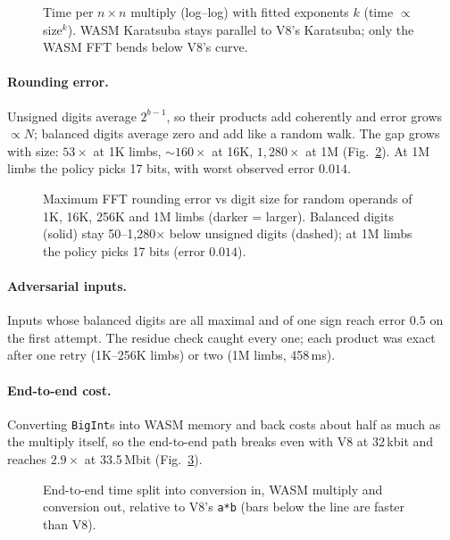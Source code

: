 \documentclass[10pt,twocolumn]{article}
\begin{document}
\begin{figure}[t]
\centering

\caption{Time per $n\times n$ multiply (log--log) with fitted exponents
$k$ (time $\propto$ size$^k$). WASM Karatsuba stays parallel to V8's Karatsuba; only the
WASM FFT bends below V8's curve.}
\label{fig:scaling}
\end{figure}

\paragraph{Rounding error.} Unsigned digits average $2^{b-1}$, so their products add
coherently and error grows $\propto N$; balanced digits average zero and add like a
random walk. The gap grows with size: $53\times$ at 1K limbs, $\sim160\times$ at 16K,
$1{,}280\times$ at 1M (Fig.~\ref{tab:err}). At 1M limbs the policy picks 17 bits, with
worst observed error $0.014$.

\begin{figure}[t]
\centering

\caption{Maximum FFT rounding error vs digit size for random operands of 1K, 16K, 256K
and 1M limbs (darker = larger). Balanced digits (solid) stay 50--1{,}280$\times$ below
unsigned digits (dashed); at 1M limbs the policy picks 17 bits (error $0.014$).}
\label{tab:err}
\end{figure}

\paragraph{Adversarial inputs.} Inputs whose balanced digits are all maximal and of one
sign reach error $0.5$ on the first attempt. The residue check caught every one; each
product was exact after one retry (1K--256K limbs) or two (1M limbs, 458\,ms).

\paragraph{End-to-end cost.} Converting \texttt{BigInt}s into WASM memory and back costs
about half as much as the multiply itself, so the end-to-end path breaks even with V8 at
32\,kbit and reaches $2.9\times$ at 33.5\,Mbit (Fig.~\ref{fig:e2e}).

\begin{figure}[t]
\centering

\caption{End-to-end time split into conversion in, WASM multiply and conversion out,
relative to V8's \texttt{a*b} (bars below the line are faster than V8).}
\label{fig:e2e}
\end{figure}
\end{document}
